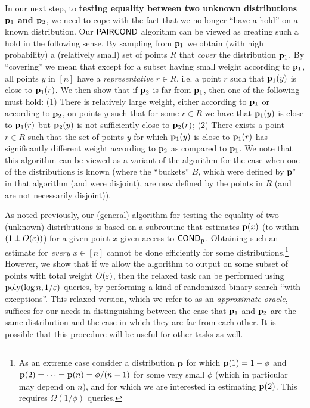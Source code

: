In our next step, to {\bf testing equality between two unknown distributions
$\mathbf{p}_1$ and $\mathbf{p}_2$},
we need to cope with the fact that we no longer ``have a hold''
on a known distribution. Our ${\sf PAIRCOND}$
algorithm can be viewed as creating
such a hold in the following sense. By sampling from $\mathbf{p}_1$ we obtain
(with high probability) a (relatively small) set of points $R$ that
{\em cover\/} the distribution $\mathbf{p}_1$. By ``covering'' we mean that
{except for a subset having small weight according to $\mathbf{p}_1$},
all points $y$ in $[n]$ have a {\em representative\/} $r \in R$,
{i.e. a point $r$}
such that $\mathbf{p}_1(y)$ is close to $\mathbf{p}_1(r)$.
We then show that if $\mathbf{p}_2$ is far from $\mathbf{p}_1$, then one of the following
must hold: (1) There is relatively large weight, either according to
$\mathbf{p}_1$ or according to $\mathbf{p}_2$, on points $y$ such that for
some $r\in R$ we have that $\mathbf{p}_1(y)$ is close to $\mathbf{p}_1(r)$ but $\mathbf{p}_2(y)$
is not sufficiently close to $\mathbf{p}_2(r)$; (2) There exists a point $r\in R$
such that {the} set of points $y$ for which $\mathbf{p}_1(y)$ is close to $\mathbf{p}_1(r)$ has
significantly different  weight according to $\mathbf{p}_2$ as compared to $\mathbf{p}_1$.
                    We note that this algorithm can be viewed as a {variant}
of the \PCOND algorithm
for the case when one of the distributions is known (where the ``buckets'' $B$,
which were defined by $\mathbf{p}^\ast$ in that algorithm (and were disjoint),
are now defined by the points in $R$ (and are not necessarily disjoint)).

As noted previously, our (general) \COND algorithm for testing the equality of
two (unknown) distributions is based on a subroutine that estimates $\mathbf{p}(x)$
(to within $(1\pm O(\varepsilon))$)
for a given point $x$ given access to ${\sf COND}_{\mathbf{p}}$. Obtaining such an
estimate for {\em every\/} $x\in [n]$ cannot be done efficiently for
some distributions.\footnote{As an extreme case consider a distribution $\mathbf{p}$
for which $\mathbf{p}(1) = 1-\phi$ and $\mathbf{p}(2)=\dots=\mathbf{p}(n) = \phi/(n-1)$ for
some very small $\phi$ (which in particular may depend on $n$), and
for which we are interested in estimating $\mathbf{p}(2)$. This requires $\Omega(1/\phi)$
queries.} However, we show that
if we allow the algorithm to output \unknown on some subset of points
with {total weight $O(\varepsilon)$},
then the relaxed task can be performed using
$\operatorname*{poly}(\log n,1/\varepsilon)$ queries, by performing a kind of randomized
binary search
``with exceptions''. This relaxed version, which we refer to as
an {\em approximate \EVAL oracle\/},  suffices for our needs in
distinguishing between the case that $\mathbf{p}_1$ and $\mathbf{p}_2$ are the same
distribution and the case in which they are far from each other.
It is possible that {this procedure} will be useful for other tasks as well.

